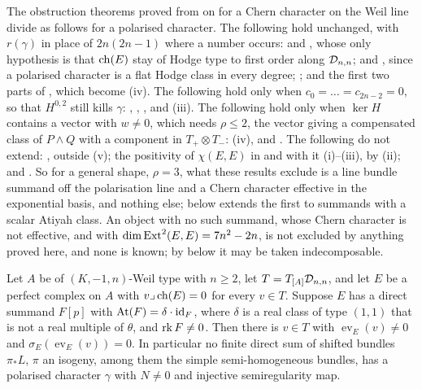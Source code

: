 \begin{remark}
\label{rem:p2primesurvive}
The obstruction theorems proved from  on for a Chern
character on the Weil line divide as follows for a polarised character. The
following hold unchanged, with
$r(\gamma)$ in place of $2n(2n-1)$ where a number occurs:
 and , whose only hypothesis is that
$\operatorname{ch}(E)$ stay of Hodge type to first order along $\mathcal{D}_{n,n}$;
 and , since a polarised character
is a flat Hodge class in every degree; ; and the
first two parts of , which become
(iv). The following hold only when
$c_{0}=\dots=c_{2n-2}=0$, so that $H^{0,2}$ still kills $\gamma$:
, , ,
 and (iii). The following hold only
when $\ker H$ contains a vector with $w\ne0$, which needs $\rho\le2$, the
vector giving a compensated class of $P\wedge Q$ with a component in
$T_{+}\otimes T_{-}$: (iv),  and
. The following do not extend: ,
outside (v); the positivity of $\chi(E,E)$ in
 and with it (i)--(iii), by
(ii); and . So for a general shape,
$\rho=3$, what these results exclude is a line bundle summand off the
polarisation line and a Chern character effective in the exponential basis,
and nothing else;  below extends the first to
summands with a scalar Atiyah class. An object with no such summand, whose
Chern character is not effective, and with $\dim\operatorname{Ext}^{2}(E,E)=7n^{2}-2n$, is
not excluded by anything proved here, and none is known; by
 below it may be taken indecomposable.
\end{remark}

\begin{proposition}\label{prop:scalaratiyah}
Let $A$ be of $(K,-1,n)$-Weil type with $n\ge2$, let $T=T_{[A]}\mathcal{D}_{n,n}$, and
let $E$ be a perfect complex on $A$ with $v\lrcorner\operatorname{ch}(E)=0$ for every
$v\in T$. Suppose $E$ has a direct summand $F[p]$ with
$\mathrm{At}(F)=\delta\cdot\operatorname{id}_{F}$, where $\delta$ is a real class of type
$(1,1)$ that is not a real multiple of $\theta$, and $\operatorname{rk} F\ne0$. Then there is
$v\in T$ with $\operatorname{ev}_{E}(v)\ne0$ and
$\sigma_{E}(\operatorname{ev}_{E}(v))=0$. In particular no finite direct sum
of shifted bundles $\pi_{*}L$, $\pi$ an isogeny, among them the simple
semi-homogeneous bundles, has a polarised character $\gamma$ with $N\ne0$ and
injective semiregularity map.
\end{proposition}

